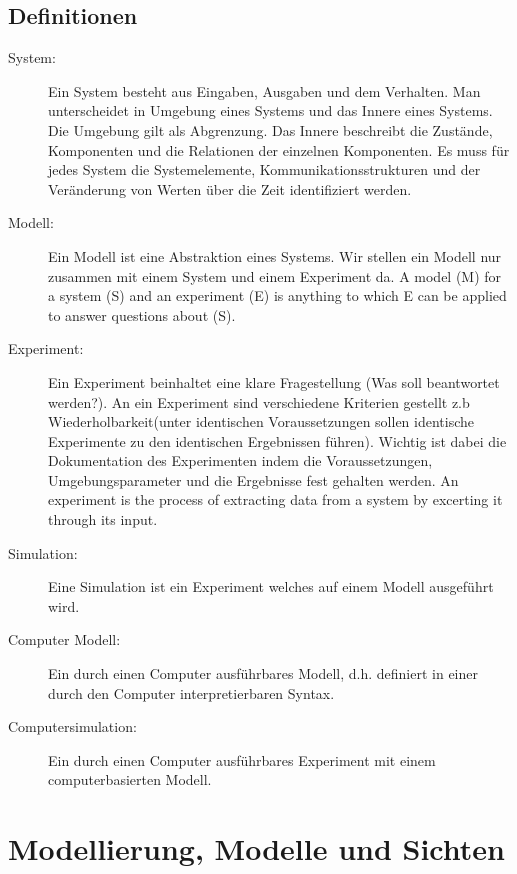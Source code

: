 \documentclass[11pt, fleqn, a4paper, leqno]{scrartcl} %
\begin{document}
	\subsection{Definitionen}
	\begin{description}
		\item[System:] Ein System besteht aus Eingaben, Ausgaben und dem Verhalten. Man unterscheidet in Umgebung eines Systems und das Innere eines Systems. Die Umgebung gilt als Abgrenzung. Das Innere beschreibt die Zustände, Komponenten und die Relationen der einzelnen Komponenten. Es muss für jedes System die Systemelemente, Kommunikationsstrukturen und der Veränderung von Werten über die Zeit identifiziert werden.
		\item[Modell:] Ein Modell ist eine Abstraktion eines Systems. Wir stellen ein Modell nur zusammen mit einem System und einem Experiment da. \glqq A model (M) for a system (S) and an experiment (E) is anything to which E can be applied to answer questions about (S).\grqq
		\item[Experiment:] Ein Experiment beinhaltet eine klare Fragestellung (Was soll beantwortet werden?). An ein Experiment sind verschiedene Kriterien gestellt z.b Wiederholbarkeit(unter identischen Voraussetzungen sollen identische Experimente zu den identischen Ergebnissen führen). Wichtig ist dabei die Dokumentation des Experimenten indem die Voraussetzungen, Umgebungsparameter und die Ergebnisse fest gehalten werden. \glqq An experiment is the process of extracting data from a system by excerting it through its input.\grqq
		\item[Simulation:] Eine Simulation ist ein Experiment welches auf einem Modell ausgeführt wird. 
		\item[Computer Modell:] Ein durch einen Computer ausführbares Modell, d.h. definiert in einer durch den Computer interpretierbaren Syntax.
		\item[Computersimulation:] Ein durch einen Computer ausführbares Experiment mit einem computerbasierten Modell.
	\end{description}
\section{Modellierung, Modelle und Sichten}
\end{document}
